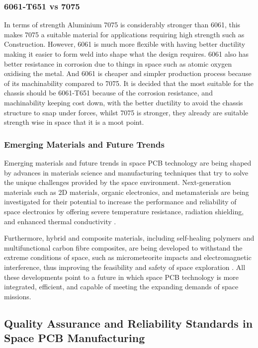 \subsubsection{6061-T651 vs  7075}
In terms of strength Aluminium 7075 is considerably stronger than 6061, this makes 7075 a suitable material for applications requiring high strength such as Construction. 
However, 6061 is much more flexible with having better ductility making it easier to form weld into shape what the design requires. 
6061 also has better resistance in corrosion due to things in space such as atomic oxygen oxidising the metal. 
And 6061 is cheaper and simpler production process because of its machinability compared to 7075. 
It is decided that the most suitable for the chassis should be 6061-T651 because of the corrosion resistance, and machinability keeping cost down, with the better ductility to avoid the chassis structure to snap under forces, whilst 7075 is stronger, they already are suitable strength wise in space that it is a moot point.

\subsubsection{Emerging Materials and Future Trends} 
Emerging materials and future trends in space PCB technology are being shaped by advances in materials science and manufacturing techniques that try to solve the unique challenges provided by the space environment. 
Next-generation materials such as 2D materials, organic electronics, and metamaterials are being investigated for their potential to increase the performance and reliability of space electronics by offering severe temperature resistance, radiation shielding, and enhanced thermal conductivity \cite{Ona-Olapo2024}.

Furthermore, hybrid and composite materials, including self-healing polymers and multifunctional carbon fibre composites, are being developed to withstand the extreme conditions of space, such as micrometeorite impacts and electromagnetic interference, thus improving the feasibility and safety of space exploration \cite{Ince2023}. 
All these developments point to a future in which space PCB technology is more integrated, efficient, and capable of meeting the expanding demands of space missions.

\subsection{Quality Assurance and Reliability Standards in Space PCB Manufacturing}

